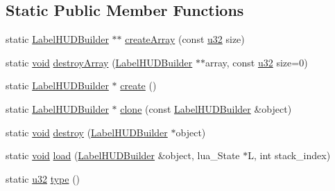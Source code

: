 \subsection*{Static Public Member Functions}
\begin{DoxyCompactItemize}
\item 
static \mbox{\hyperlink{classnjli_1_1_label_h_u_d_builder}{Label\+H\+U\+D\+Builder}} $\ast$$\ast$ \mbox{\hyperlink{classnjli_1_1_label_h_u_d_builder_aca3bb53dfeb5df96087f7ef7d861c7f3}{create\+Array}} (const \mbox{\hyperlink{_util_8h_a10e94b422ef0c20dcdec20d31a1f5049}{u32}} size)
\item 
static \mbox{\hyperlink{_thread_8h_af1e856da2e658414cb2456cb6f7ebc66}{void}} \mbox{\hyperlink{classnjli_1_1_label_h_u_d_builder_a4a8ec57b63478657ff1869393d242b79}{destroy\+Array}} (\mbox{\hyperlink{classnjli_1_1_label_h_u_d_builder}{Label\+H\+U\+D\+Builder}} $\ast$$\ast$array, const \mbox{\hyperlink{_util_8h_a10e94b422ef0c20dcdec20d31a1f5049}{u32}} size=0)
\item 
static \mbox{\hyperlink{classnjli_1_1_label_h_u_d_builder}{Label\+H\+U\+D\+Builder}} $\ast$ \mbox{\hyperlink{classnjli_1_1_label_h_u_d_builder_abc86417c388dcf96cdae374ada398b5e}{create}} ()
\item 
static \mbox{\hyperlink{classnjli_1_1_label_h_u_d_builder}{Label\+H\+U\+D\+Builder}} $\ast$ \mbox{\hyperlink{classnjli_1_1_label_h_u_d_builder_a793337df080b9df135e1876e49e164ac}{clone}} (const \mbox{\hyperlink{classnjli_1_1_label_h_u_d_builder}{Label\+H\+U\+D\+Builder}} \&object)
\item 
static \mbox{\hyperlink{_thread_8h_af1e856da2e658414cb2456cb6f7ebc66}{void}} \mbox{\hyperlink{classnjli_1_1_label_h_u_d_builder_a6651f48628a7bddbc66bf39b52f46491}{destroy}} (\mbox{\hyperlink{classnjli_1_1_label_h_u_d_builder}{Label\+H\+U\+D\+Builder}} $\ast$object)
\item 
static \mbox{\hyperlink{_thread_8h_af1e856da2e658414cb2456cb6f7ebc66}{void}} \mbox{\hyperlink{classnjli_1_1_label_h_u_d_builder_a805ef11e96ae7cb6fee203a3779bf345}{load}} (\mbox{\hyperlink{classnjli_1_1_label_h_u_d_builder}{Label\+H\+U\+D\+Builder}} \&object, lua\+\_\+\+State $\ast$L, int stack\+\_\+index)
\item 
static \mbox{\hyperlink{_util_8h_a10e94b422ef0c20dcdec20d31a1f5049}{u32}} \mbox{\hyperlink{classnjli_1_1_label_h_u_d_builder_a2393097c6cfd7d456fb5af065ac68631}{type}} ()
\end{DoxyCompactItemize}

